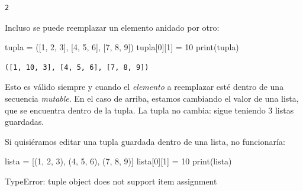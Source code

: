 \documentclass[
  letterpaper,
  DIV=11,
  numbers=noendperiod]{scrreprt}
\newenvironment{Shaded}{\begin{snugshade}}{\end{snugshade}}
\newcommand{\BuiltInTok}[1]{\textcolor[rgb]{0.00,0.23,0.31}{#1}}
\newcommand{\DecValTok}[1]{\textcolor[rgb]{0.68,0.00,0.00}{#1}}
\newcommand{\NormalTok}[1]{\textcolor[rgb]{0.00,0.23,0.31}{#1}}
\newcommand{\OperatorTok}[1]{\textcolor[rgb]{0.37,0.37,0.37}{#1}}
\begin{document}
\begin{tcolorbox}
\begin{verbatim}
2
\end{verbatim}

Incluso se puede reemplazar un elemento anidado por otro:

\begin{Shaded}
\begin{Highlighting}[]
\NormalTok{tupla }\OperatorTok{=}\NormalTok{ ([}\DecValTok{1}\NormalTok{, }\DecValTok{2}\NormalTok{, }\DecValTok{3}\NormalTok{], [}\DecValTok{4}\NormalTok{, }\DecValTok{5}\NormalTok{, }\DecValTok{6}\NormalTok{], [}\DecValTok{7}\NormalTok{, }\DecValTok{8}\NormalTok{, }\DecValTok{9}\NormalTok{])}
\NormalTok{tupla[}\DecValTok{0}\NormalTok{][}\DecValTok{1}\NormalTok{] }\OperatorTok{=} \DecValTok{10}
\BuiltInTok{print}\NormalTok{(tupla)}
\end{Highlighting}
\end{Shaded}

\begin{verbatim}
([1, 10, 3], [4, 5, 6], [7, 8, 9])
\end{verbatim}

Esto es válido siempre y cuando el \emph{elemento} a reemplazar esté
dentro de una secuencia \emph{mutable}. En el caso de arriba, estamos
cambiando el valor de una lista, que se encuentra dentro de la tupla. La
tupla no cambia: sigue teniendo 3 listas guardadas.

Si quisiéramos editar una tupla guardada dentro de una lista, no
funcionaría:

\begin{Shaded}
\begin{Highlighting}[]
\NormalTok{lista }\OperatorTok{=}\NormalTok{ [(}\DecValTok{1}\NormalTok{, }\DecValTok{2}\NormalTok{, }\DecValTok{3}\NormalTok{), (}\DecValTok{4}\NormalTok{, }\DecValTok{5}\NormalTok{, }\DecValTok{6}\NormalTok{), (}\DecValTok{7}\NormalTok{, }\DecValTok{8}\NormalTok{, }\DecValTok{9}\NormalTok{)]}
\NormalTok{lista[}\DecValTok{0}\NormalTok{][}\DecValTok{1}\NormalTok{] }\OperatorTok{=} \DecValTok{10}
\BuiltInTok{print}\NormalTok{(lista)}
\end{Highlighting}
\end{Shaded}

\begin{Shaded}
\begin{Highlighting}[]
\NormalTok{TypeError: \textquotesingle{}tuple\textquotesingle{} object does not support item assignment}
\end{Highlighting}
\end{Shaded}

\end{tcolorbox}
\end{document}
